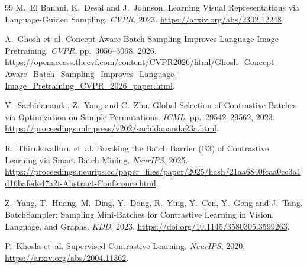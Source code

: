 \documentclass{article}
\begin{document}
\begin{thebibliography}{99}
M.~El Banani, K.~Desai and J.~Johnson.
Learning Visual Representations via Language-Guided Sampling.
\emph{CVPR}, 2023. \url{https://arxiv.org/abs/2302.12248}.

A.~Ghosh et~al.
Concept-Aware Batch Sampling Improves Language-Image Pretraining.
\emph{CVPR}, pp.~3056--3068, 2026.
\url{https://openaccess.thecvf.com/content/CVPR2026/html/Ghosh_Concept-Aware_Batch_Sampling_Improves_Language-Image_Pretraining_CVPR_2026_paper.html}.

V.~Sachidananda, Z.~Yang and C.~Zhu.
Global Selection of Contrastive Batches via Optimization on Sample
Permutations. \emph{ICML}, pp.~29542--29562, 2023.
\url{https://proceedings.mlr.press/v202/sachidananda23a.html}.

R.~Thirukovalluru et~al.
Breaking the Batch Barrier (B3) of Contrastive Learning via Smart
Batch Mining. \emph{NeurIPS}, 2025.
\url{https://proceedings.neurips.cc/paper_files/paper/2025/hash/21aa6840fcaa0cc3a1d16bafede47a2f-Abstract-Conference.html}.

Z.~Yang, T.~Huang, M.~Ding, Y.~Dong, R.~Ying, Y.~Cen,
Y.~Geng and J.~Tang.
BatchSampler: Sampling Mini-Batches for Contrastive Learning in Vision,
Language, and Graphs. \emph{KDD}, 2023.
\url{https://doi.org/10.1145/3580305.3599263}.

P.~Khosla et~al.
Supervised Contrastive Learning. \emph{NeurIPS}, 2020.
\url{https://arxiv.org/abs/2004.11362}.


\end{thebibliography}
\endgroup

\clearpage
\appendix
\end{document}
